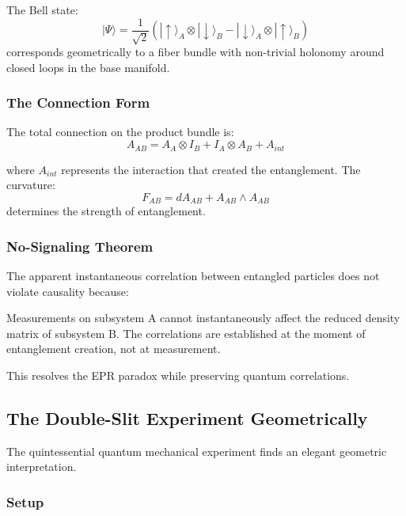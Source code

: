 The Bell state:
\begin{equation}
    |\Psi\rangle = \frac{1}{\sqrt{2}}(|\uparrow\rangle_A \otimes |\downarrow\rangle_B - |\downarrow\rangle_A \otimes |\uparrow\rangle_B)
\end{equation}
corresponds geometrically to a fiber bundle with non-trivial holonomy around closed loops in the base manifold.

\subsubsection{The Connection Form}

The total connection on the product bundle is:
\begin{equation}
    A_{AB} = A_A \otimes I_B + I_A \otimes A_B + A_{int}
\end{equation}

where $A_{int}$ represents the interaction that created the entanglement. The curvature:
\begin{equation}
    F_{AB} = dA_{AB} + A_{AB} \wedge A_{AB}
\end{equation}
determines the strength of entanglement.

\subsubsection{No-Signaling Theorem}

The apparent instantaneous correlation between entangled particles does not violate causality because:

\begin{theorem}
Measurements on subsystem A cannot instantaneously affect the reduced density matrix of subsystem B. The correlations are established at the moment of entanglement creation, not at measurement.
\end{theorem}

This resolves the EPR paradox while preserving quantum correlations.

\subsection{The Double-Slit Experiment Geometrically}

The quintessential quantum mechanical experiment finds an elegant geometric interpretation.

\subsubsection{Setup}

